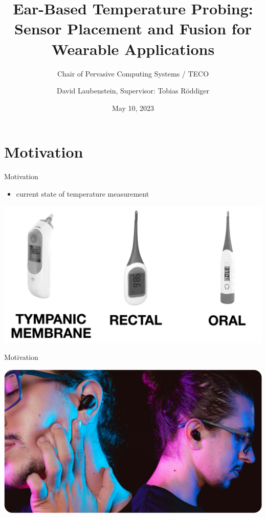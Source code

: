 \documentclass[en]{sdqbeamer}
\title[Ear-Based Temperature Probing]{Ear-Based Temperature Probing: \\ Sensor Placement and Fusion for Wearable Applications}
\subtitle{Chair of Pervasive Computing Systems / TECO}
\author[David Laubenstein]{David Laubenstein, Supervisor: Tobias Röddiger}
\date[05/10/2023]{May 10, 2023}
\begin{document}
 
\KITtitleframe


\section{Motivation}
\begin{frame}{Motivation}
    \begin{itemize}
        \item current state of temperature measurement \cite{TemperatureDigitalGlassa}
    \end{itemize}
    \begin{center}
        \includegraphics[scale=0.16]{proposal-presentation/images/thermometer_types.jpg}    
    \end{center}
\end{frame}

\begin{frame}{Motivation}
    \begin{center}
        \includegraphics[scale=0.16]{proposal-presentation/images/inears/earbuds_picture.jpg}
    \end{center}
\end{frame}
\end{document}
